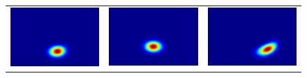 \begin{figure}[H]
\centerfloat
\begin{tabular}{ccc}
  \includegraphics[scale = 0.29]{QHO1.png}  &   \includegraphics[scale = 0.29]{slit2.png}   &   \includegraphics[scale = 0.29]{QHO3.png} \\

\end{tabular}
\end{figure}
